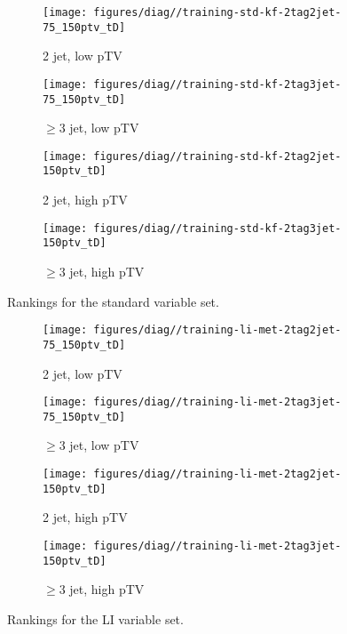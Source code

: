 \begin{figure}[!htbp]\captionsetup{justification=centering}
  \centering
\begin{subfigure}[t]{0.49\textwidth}\centering\texttt{[image: figures/diag//training-std-kf-2tag2jet-75\_150ptv\_tD]}\caption{2 jet, low pTV}\end{subfigure}
\begin{subfigure}[t]{0.49\textwidth}\centering\texttt{[image: figures/diag//training-std-kf-2tag3jet-75\_150ptv\_tD]}\caption{$\ge3$ jet, low pTV}\end{subfigure}
\begin{subfigure}[t]{0.49\textwidth}\centering\texttt{[image: figures/diag//training-std-kf-2tag2jet-150ptv\_tD]}\caption{2 jet, high pTV}\end{subfigure}
\begin{subfigure}[t]{0.49\textwidth}\centering\texttt{[image: figures/diag//training-std-kf-2tag3jet-150ptv\_tD]}\caption{$\ge3$ jet, high pTV}\end{subfigure}
  \caption{Rankings for the standard variable set.}
  \label{fig:std-kf-Ranking}
\end{figure}

\begin{figure}[!htbp]\captionsetup{justification=centering}
  \centering
\begin{subfigure}[t]{0.49\textwidth}\centering\texttt{[image: figures/diag//training-li-met-2tag2jet-75\_150ptv\_tD]}\caption{2 jet, low pTV}\end{subfigure}
\begin{subfigure}[t]{0.49\textwidth}\centering\texttt{[image: figures/diag//training-li-met-2tag3jet-75\_150ptv\_tD]}\caption{$\ge3$ jet, low pTV}\end{subfigure}
\begin{subfigure}[t]{0.49\textwidth}\centering\texttt{[image: figures/diag//training-li-met-2tag2jet-150ptv\_tD]}\caption{2 jet, high pTV}\end{subfigure}
\begin{subfigure}[t]{0.49\textwidth}\centering\texttt{[image: figures/diag//training-li-met-2tag3jet-150ptv\_tD]}\caption{$\ge3$ jet, high pTV}\end{subfigure}
  \caption{Rankings for the LI variable set.}
  \label{fig:li-met-Ranking}
\end{figure}

